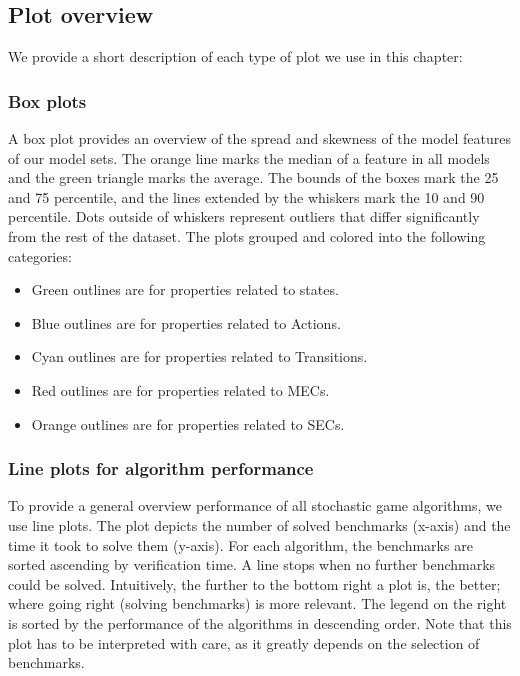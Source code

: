 \subsection{Plot overview} \label{subsec:plots}
We provide a short description of each type of plot we use in this chapter:
\subsubsection*{Box plots} \label{plot:boxplot}
A box plot provides an overview of the spread and skewness of the model features of our model sets.
The orange line marks the median of a feature in all models and the green triangle marks the
average. The bounds of the boxes mark the 25 and 75 percentile, and the lines extended
by the whiskers mark the 10 and 90 percentile. Dots outside of whiskers represent
outliers that differ significantly from the rest of the dataset.
The plots grouped and colored into the following categories:
\begin{itemize}
    \item Green outlines are for properties related to states. 
    \item Blue outlines are for properties related to Actions. 
    \item Cyan outlines are for properties related to Transitions.
    \item Red outlines are for properties related to MECs.
    \item Orange outlines are for properties related to SECs. 
\end{itemize}

\subsubsection*{Line plots for algorithm performance} \label{plot:starplot}
To provide a general overview performance of all stochastic game algorithms, we use line plots.
The plot depicts the number of solved benchmarks (x-axis) and the time it took to solve them (y-axis). 
For each algorithm, the benchmarks are sorted ascending by verification time. A line stops when no further benchmarks could be solved.
Intuitively, the further to the bottom right a plot is, the better; where going right (solving benchmarks) is more relevant.
The legend on the right is sorted by the performance of the algorithms in descending order.
Note that this plot has to be interpreted with care, as it greatly depends on the selection of benchmarks.

